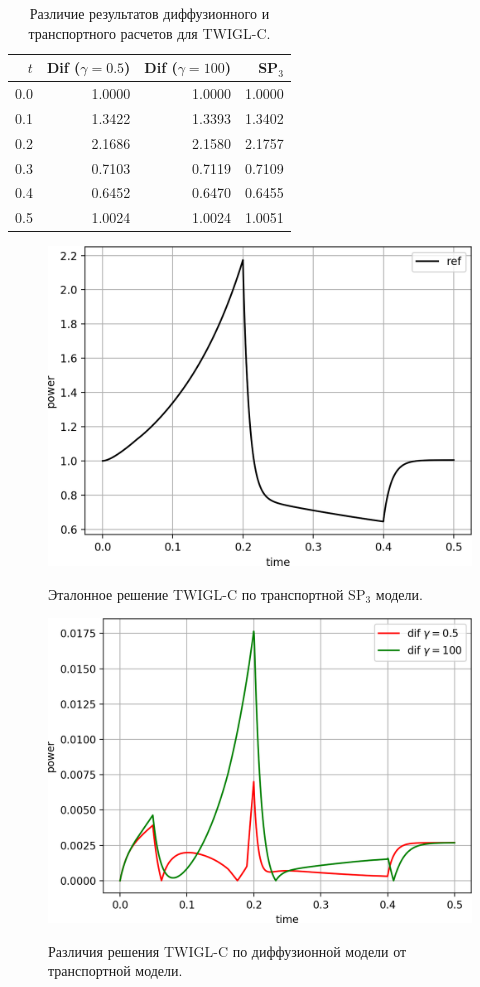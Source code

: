 \documentclass{crm-article}
\begin{document}
\begin{table}[htp]
\caption{Различие результатов диффузионного и транспортного расчетов для TWIGL-C.}
\label{table:twigl-c}
\begin{center}
\begin{tabular}{r r r r}
\hline
$t$ & Dif ($\gamma=0.5$) & Dif ($\gamma=100$) & SP$_3$\\
\hline
0.0 & 1.0000 & 1.0000 & 1.0000\\
0.1 & 1.3422  & 1.3393 & 1.3402\\
0.2 & 2.1686  & 2.1580 & 2.1757\\
0.3 & 0.7103  & 0.7119 & 0.7109\\
0.4 & 0.6452 & 0.6470 & 0.6455\\
0.5 & 1.0024  & 1.0024 & 1.0051\\
\hline
\end{tabular}
\end{center}
\end{table}

\begin{figure}[ht]
\begin{center}
	\includegraphics[width=0.5\linewidth]{sp3_ref_c.png}\\
	\caption{\label{image:canonsummary} Эталонное решение TWIGL-C по транспортной SP$_3$ модели.}
	\label{ris:sp3_ref_c}
\end{center}
\end{figure}

\begin{figure}[ht]
\begin{center}
	\includegraphics[width=0.5\linewidth]{odds_c.png}\\
	\caption{\label{image:canonsummary} Различия решения TWIGL-C по диффузионной модели от транспортной модели.}
	\label{ris:odds_c}
\end{center}
\end{figure}
\end{document}
